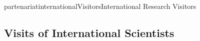\documentclass{ra2016}
\begin{document}
\begin{module}{partenariat}{internationalVisitors}{International Research Visitors}


\subsection{Visits of International Scientists}




\end{module}
\end{document}

